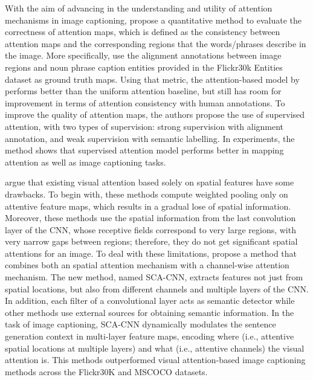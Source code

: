 With the aim of advancing in the understanding and utility of attention mechanisms in image captioning, \citet{Liu2017_SAM} propose a quantitative method to evaluate the correctness of attention maps, which is defined as the consistency between attention maps and the corresponding regions that the words/phrases describe in the image. More specifically, \citeauthor{Liu2017_SAM} use the alignment annotations between image regions and noun phrase caption entities provided in the Flickr30k Entities dataset \citep{Plummer2015} as  ground truth maps. Using that metric, the attention-based model by \citet{Xu2015} performs better than the uniform attention baseline, but still has room for improvement in terms of attention consistency with human annotations. To improve the quality of attention maps, the authors propose the use of supervised attention, with two types of supervision: strong supervision with alignment annotation, and weak supervision with semantic labelling. In experiments, the method shows that supervised attention model performs better in mapping attention as well as image captioning tasks.

\citet{Chen2017} argue that existing visual attention based solely on spatial features have some drawbacks. To begin with, these methods compute weighted pooling only on attentive feature maps, which results in a gradual lose of spatial information. Moreover, these methods use the spatial information from the last convolution layer of the CNN, whose receptive fields correspond to very large regions, with very narrow gaps between regions; therefore, they do not get significant spatial attentions for an image. To deal with these limitations, \citeauthor{Chen2017} propose a method that combines both an spatial attention mechanism with a channel-wise attention mechanism. The new method, named SCA-CNN, extracts features not just from spatial locations, but also from different channels and multiple layers of the CNN. In addition, each filter of a convolutional layer acts as semantic detector \citep{Zeiler2014} while other methods use external sources for obtaining semantic information. In the task of image captioning, SCA-CNN dynamically modulates the sentence generation context in multi-layer feature maps, encoding where (i.e., attentive spatial locations at multiple layers) and what (i.e., attentive channels) the visual attention is. This methods outperformed visual attention-based image captioning methods across the Flickr30K and MSCOCO datasets.

